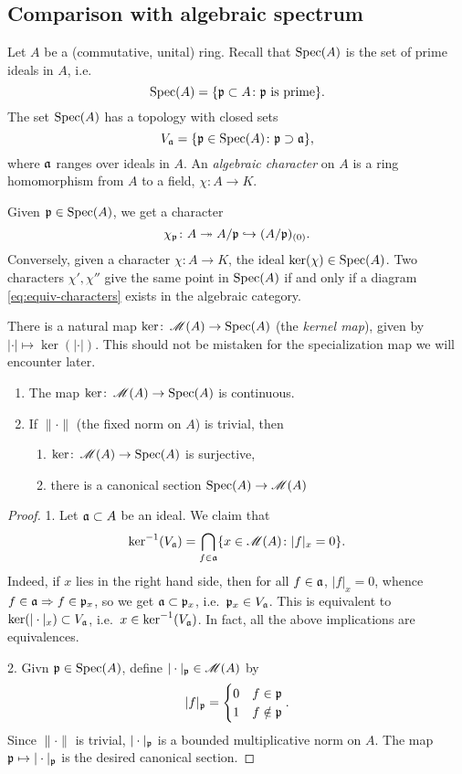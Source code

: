 \subsection{Comparison with algebraic spectrum}

Let $A$ be a (commutative, unital) ring. Recall that $\operatorname{Spec}(A)$ is the set of 
prime ideals in $A$, i.e.
\[
  \operatorname{Spec}(A) = \{\mathfrak{p}\subset A\colon \mathfrak{p}\text{ is prime}\} .
\]
The set $\operatorname{Spec}(A)$ has a topology with closed sets 
\[
  V_{\mathfrak{a}} = \{\mathfrak{p}\in \operatorname{Spec}(A)\colon \mathfrak{p}\supset \mathfrak{a}\} ,
\]
where $\mathfrak{a}$ ranges over ideals in $A$. An \emph{algebraic character} on $A$ is 
a ring homomorphism from $A$ to a field, $\chi\colon A\to K$. 

Given $\mathfrak{p}\in \operatorname{Spec}(A)$, we get a character 
\[
  \chi_{\mathfrak{p}}\colon A\twoheadrightarrow A/\mathfrak{p} \hookrightarrow (A/\mathfrak{p})_{(0)} .
\]
Conversely, given a character $\chi\colon A\to K$, the ideal 
$\ker(\chi)\in \operatorname{Spec}(A)$. Two characters $\chi',\chi''$ give the same point in 
$\operatorname{Spec}(A)$ if and only if a diagram \eqref{eq:equiv-characters} exists in the 
algebraic category.

There is a natural map $\ker\colon \operatorname{\mathscr{M}}(A)\to \operatorname{Spec}(A)$ (the \emph{kernel 
map}), given by $|\cdot|\mapsto \ker(|\cdot|)$. This should not be mistaken for 
the specialization map we will encounter later. 

\begin{lemma}
\leavevmode
\begin{enumerate}
\item
The map $\ker\colon \operatorname{\mathscr{M}}(A)\to \operatorname{Spec}(A)$ is continuous. 

\item
If $\|\cdot\|$ (the fixed norm on $A$) is trivial, then 
\begin{enumerate}
\item
$\ker\colon \operatorname{\mathscr{M}}(A)\to \operatorname{Spec}(A)$ is surjective, 

\item
there is a canonical section $\operatorname{Spec}(A)\to \operatorname{\mathscr{M}}(A)$
\end{enumerate}
\end{enumerate}
\end{lemma}
\begin{proof}
1. Let $\mathfrak{a}\subset A$ be an ideal. We claim that  
\[
  \ker^{-1}(V_{\mathfrak{a}}) = \bigcap_{f\in \mathfrak{a}}\{x\in \operatorname{\mathscr{M}}(A)\colon |f|_x = 0\} .
\]
Indeed, if $x$ lies in the right hand side, then for all $f\in \mathfrak{a}$, 
$|f|_x=0$, whence $f\in \mathfrak{a}\Rightarrow f\in \mathfrak{p}_x$, so we get 
$\mathfrak{a}\subset \mathfrak{p}_x$, i.e.~$\mathfrak{p}_x\in V_{\mathfrak{a}}$. This is equivalent to 
$\ker(|\cdot|_x)\subset V_{\mathfrak{a}}$, i.e.~$x\in \ker^{-1}(V_{\mathfrak{a}})$. In fact, all the 
above implications are equivalences.

2. Givn $\mathfrak{p}\in \operatorname{Spec}(A)$, define $|\cdot|_{\mathfrak{p}}\in \operatorname{\mathscr{M}}(A)$ by 
\[
  |f|_{\mathfrak{p}} = \begin{cases} 0 & f\in \mathfrak{p} \\ 1 & f\notin \mathfrak{p} \end{cases} .
\]
Since $\|\cdot\|$ is trivial, $|\cdot|_{\mathfrak{p}}$ is a bounded multiplicative 
norm on $A$. The map $\mathfrak{p}\mapsto |\cdot|_{\mathfrak{p}}$ is the desired canonical 
section. 
\end{proof}


